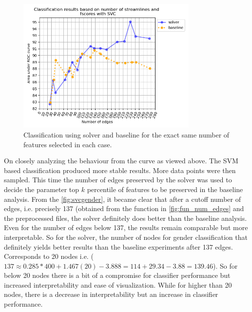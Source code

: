 \documentclass[msthesis.tex]{subfiles}
\begin{document}
\begin{figure}
    \centering
    \includegraphics[width=0.8\textwidth]{images/select_clf_auf_gender_2_scaled.png}
    \caption{Classification using solver and baseline for the exact same number of features selected in each case.}
    \label{fig:svcgender}
\end{figure}

On closely analyzing the behaviour from the curve as viewed above. The SVM based classification produced more stable results. More data points were then sampled. This time the number of edges preserved by the solver was used to decide the parameter top $k$ percentile of features to be preserved in the baseline analysis. From the \autoref{fig:svcgender}, it became clear that after a cutoff number of edges, i.e. precisely 137 (obtained from the function in \autoref{fig:fun_num_edges} and the preprocessed files, the solver definitely does better than the baseline analysis. Even for the number of edges below 137, the results remain comparable but more interpretable. So for the solver, the number of nodes for gender classification that definitely yields better results than the baseline experiments after 137 edges. Corresponds to 20 nodes i.e. ($137 \approx 0.285* 400 + 1.467(20) - 3.888 = 114 + 29.34-3.88 = 139.46$). So for below 20 nodes there is a bit of a compromise for classifier performance but increased interpretability and ease of visualization. While for higher than 20 nodes, there is a decrease in interpretability but an increase in classifier performance.
\end{document}
